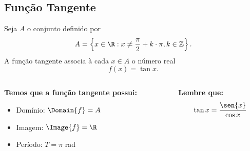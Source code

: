 \subsection{Função Tangente}
\begin{frame}
  \begin{definition}
    Seja $A$ o conjunto definido por
    \begin{equation*}
      A=\left\{x\in\R : x\not= \frac{\pi}{2} + k\cdot\pi, k\in\mathbb{Z}\right\}.
    \end{equation*}
    A função tangente associa à cada $x\in A$ o número real
    \begin{equation*}
      f(x)=\tan{x}.
    \end{equation*}
  \end{definition}
  \begin{columns}[onlytextwidth]
    \begin{column}{0.49\textwidth}
      \begin{highlight}
        \textbf{Temos que a função tangente possui:}
        \begin{itemize}
          \item Domínio: $\Domain{f} = A$
          \item Imagem: $\Image{f} = \R$
          \item Período: $T = \pi$ rad
        \end{itemize}
      \end{highlight}
    \end{column}
    \begin{column}{0.49\textwidth}
      \begin{highlight}
        \textbf{Lembre que:}
        \begin{equation*}
          \tan{x} = \frac{\sen{x}}{\cos{x}}
        \end{equation*}
      \end{highlight}
    \end{column}
  \end{columns}
\end{frame}

\begin{frame}[c]
  \begin{figure}
  \end{figure}
\end{frame}

